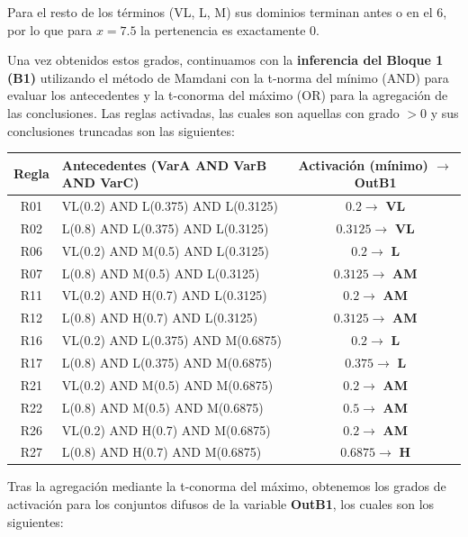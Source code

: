 \documentclass[11pt, a4paper]{article}
\newenvironment{problem}[1][Cuestión]{
	\vspace{0.5cm}
	\noindent{\Large\bfseries #1} \par\vspace{0.5cm}
}{
	\vspace{0.5cm}
}
\begin{document}
\begin{problem}[Problema 2 (60 \%)]
{				Para el resto de los términos (VL, L, M) sus dominios terminan antes o en el $6$, por lo que para $x=7.5$ la pertenencia es exactamente $0$.

				Una vez obtenidos estos grados, continuamos con la \textbf{inferencia del Bloque 1 (B1)} utilizando el método de Mamdani con la t-norma del mínimo (AND) para evaluar los antecedentes y la t-conorma del máximo (OR) para la agregación de las conclusiones. Las reglas activadas, las cuales son aquellas con grado $> 0$ y sus conclusiones truncadas son las siguientes:

				\begin{table}[H]
					\centering
					\color{blue}
					\begin{tabular}{clc}
						\toprule
						\textbf{Regla} & \textbf{Antecedentes (VarA AND VarB AND VarC)} & \textbf{Activación (mínimo) $\rightarrow$ OutB1} \\
						\midrule
						R01 & VL(0.2) AND L(0.375) AND L(0.3125) & $0.2 \rightarrow$ \textbf{VL} \\
						R02 & L(0.8) AND L(0.375) AND L(0.3125) & $0.3125 \rightarrow$ \textbf{VL} \\
						R06 & VL(0.2) AND M(0.5) AND L(0.3125) & $0.2 \rightarrow$ \textbf{L} \\
						R07 & L(0.8) AND M(0.5) AND L(0.3125) & $0.3125 \rightarrow$ \textbf{AM} \\
						R11 & VL(0.2) AND H(0.7) AND L(0.3125) & $0.2 \rightarrow$ \textbf{AM} \\
						R12 & L(0.8) AND H(0.7) AND L(0.3125) & $0.3125 \rightarrow$ \textbf{AM} \\
						R16 & VL(0.2) AND L(0.375) AND M(0.6875) & $0.2 \rightarrow$ \textbf{L} \\
						R17 & L(0.8) AND L(0.375) AND M(0.6875) & $0.375 \rightarrow$ \textbf{L} \\
						R21 & VL(0.2) AND M(0.5) AND M(0.6875) & $0.2 \rightarrow$ \textbf{AM} \\
						R22 & L(0.8) AND M(0.5) AND M(0.6875) & $0.5 \rightarrow$ \textbf{AM} \\
						R26 & VL(0.2) AND H(0.7) AND M(0.6875) & $0.2 \rightarrow$ \textbf{AM} \\
						R27 & L(0.8) AND H(0.7) AND M(0.6875) & $0.6875 \rightarrow$ \textbf{H} \\
						\bottomrule
					\end{tabular}
				\end{table}

				Tras la agregación mediante la t-conorma del máximo, obtenemos los grados de activación para los conjuntos difusos de la variable \textbf{OutB1}, los cuales son los siguientes:

}
\end{problem}
\end{document}
